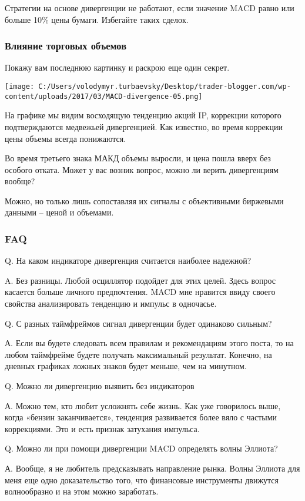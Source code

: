 \documentclass[a5paper]{article}
\begin{document}
    Стратегии на основе дивергенции не работают, если значение MACD равно или больше 10\% цены бумаги. Избегайте таких сделок.

\subsubsection{Влияние торговых объемов}

Покажу вам последнюю картинку и раскрою еще один секрет.

\texttt{[image: C:/Users/volodymyr.turbaevsky/Desktop/trader-blogger.com/wp-content/uploads/2017/03/MACD-divergence-05.png]}

На графике мы видим восходящую тенденцию акций IP, коррекции которого подтверждаются медвежьей дивергенцией. Как известно, во время коррекции цены объемы всегда понижаются.

Во время третьего знака МАКД объемы выросли, и цена пошла вверх без особого отката. Может у вас возник вопрос, можно ли верить дивергенциям вообще?

    Можно, но только лишь сопоставляя их сигналы с объективными биржевыми данными – ценой и объемами.

\subsubsection{FAQ}

Q. На каком индикаторе дивергенция считается наиболее надежной?

A. Без разницы. Любой осциллятор подойдет для этих целей. Здесь вопрос касается больше личного предпочтения. MACD мне нравится ввиду своего свойства анализировать тенденцию и импульс в одночасье.

Q. С разных таймфреймов сигнал дивергенции будет одинаково сильным?

А. Если вы будете следовать всем правилам и рекомендациям этого поста, то на любом таймфрейме будете получать максимальный результат. Конечно, на дневных графиках ложных знаков будет меньше, чем на минутном.

Q. Можно ли дивергенцию выявить без индикаторов

А. Можно тем, кто любит усложнять себе жизнь. Как уже говорилось выше, когда «бензин заканчивается», тенденция развивается более вяло с частыми коррекциями. Это и есть признак затухания импульса.

Q. Можно ли при помощи дивергенции MACD определять волны Эллиота?

А. Вообще, я не любитель предсказывать направление рынка. Волны Эллиота для меня еще одно доказательство того, что финансовые инструменты движутся волнообразно и на этом можно заработать.
\end{document}
